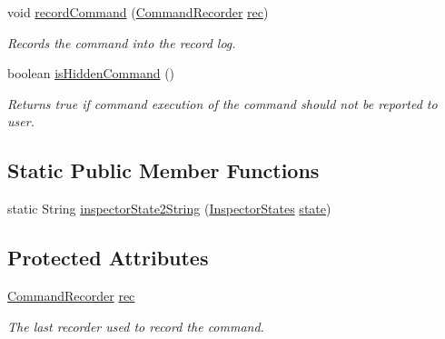 \begin{DoxyCompactItemize}
void \hyperlink{classgov_1_1nasa_1_1jpf_1_1inspector_1_1client_1_1commands_1_1_cmd_callback_a95d58b5356ce0f50d9661933f4540678}{record\+Command} (\hyperlink{classgov_1_1nasa_1_1jpf_1_1inspector_1_1client_1_1_command_recorder}{Command\+Recorder} \hyperlink{classgov_1_1nasa_1_1jpf_1_1inspector_1_1client_1_1_client_command_af4246f2427035c72a6af45a2c61361f7}{rec})
\begin{DoxyCompactList}\small\item\em Records the command into the record log. \end{DoxyCompactList}\item 
boolean \hyperlink{classgov_1_1nasa_1_1jpf_1_1inspector_1_1client_1_1commands_1_1_cmd_callback_a196411a6371699b106676b6e9e284918}{is\+Hidden\+Command} ()
\begin{DoxyCompactList}\small\item\em Returns true if command execution of the command should not be reported to user. \end{DoxyCompactList}\end{DoxyCompactItemize}
\subsection*{Static Public Member Functions}
\begin{DoxyCompactItemize}
\item 
static String \hyperlink{classgov_1_1nasa_1_1jpf_1_1inspector_1_1client_1_1commands_1_1_cmd_callback_ab33dc86106aecd93ec2ae0d614711346}{inspector\+State2\+String} (\hyperlink{enumgov_1_1nasa_1_1jpf_1_1inspector_1_1interfaces_1_1_commands_interface_1_1_inspector_states}{Inspector\+States} \hyperlink{classgov_1_1nasa_1_1jpf_1_1inspector_1_1client_1_1commands_1_1_cmd_callback_a565db0f21a577f23952aaa47706b7cbd}{state})
\end{DoxyCompactItemize}
\subsection*{Protected Attributes}
\begin{DoxyCompactItemize}
\item 
\hyperlink{classgov_1_1nasa_1_1jpf_1_1inspector_1_1client_1_1_command_recorder}{Command\+Recorder} \hyperlink{classgov_1_1nasa_1_1jpf_1_1inspector_1_1client_1_1_client_command_af4246f2427035c72a6af45a2c61361f7}{rec}
\begin{DoxyCompactList}\small\item\em The last recorder used to record the command. \end{DoxyCompactList}\end{DoxyCompactItemize}
